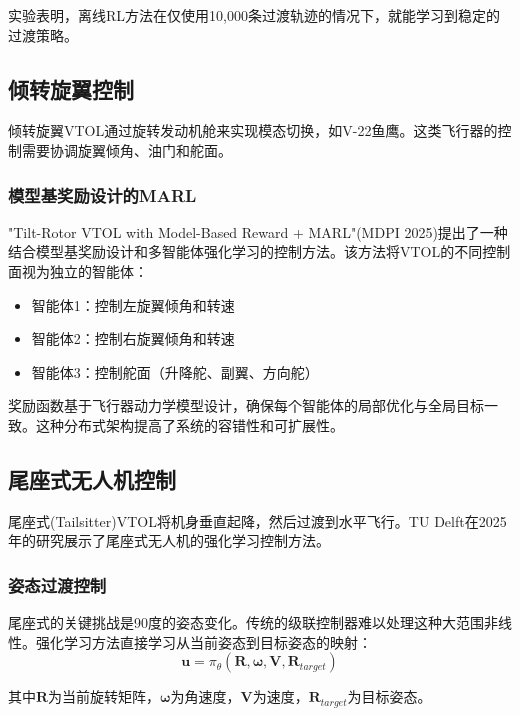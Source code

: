\documentclass[12pt,a4paper]{ctexart}
\begin{document}
实验表明，离线RL方法在仅使用10,000条过渡轨迹的情况下，就能学习到稳定的过渡策略。

\subsection{倾转旋翼控制}

倾转旋翼VTOL通过旋转发动机舱来实现模态切换，如V-22鱼鹰。这类飞行器的控制需要协调旋翼倾角、油门和舵面。

\subsubsection{模型基奖励设计的MARL}

"Tilt-Rotor VTOL with Model-Based Reward + MARL"(MDPI 2025)提出了一种结合模型基奖励设计和多智能体强化学习的控制方法。该方法将VTOL的不同控制面视为独立的智能体：

\begin{itemize}
    \item 智能体1：控制左旋翼倾角和转速
    \item 智能体2：控制右旋翼倾角和转速
    \item 智能体3：控制舵面（升降舵、副翼、方向舵）
\end{itemize}

奖励函数基于飞行器动力学模型设计，确保每个智能体的局部优化与全局目标一致。这种分布式架构提高了系统的容错性和可扩展性。

\subsection{尾座式无人机控制}

尾座式(Tailsitter)VTOL将机身垂直起降，然后过渡到水平飞行。TU Delft在2025年的研究展示了尾座式无人机的强化学习控制方法。

\subsubsection{姿态过渡控制}

尾座式的关键挑战是90度的姿态变化。传统的级联控制器难以处理这种大范围非线性。强化学习方法直接学习从当前姿态到目标姿态的映射：
\begin{equation}
    \mathbf{u} = \pi_\theta(\mathbf{R}, \boldsymbol{\omega}, \mathbf{V}, \mathbf{R}_{target})
\end{equation}

其中$\mathbf{R}$为当前旋转矩阵，$\boldsymbol{\omega}$为角速度，$\mathbf{V}$为速度，$\mathbf{R}_{target}$为目标姿态。
\end{document}
